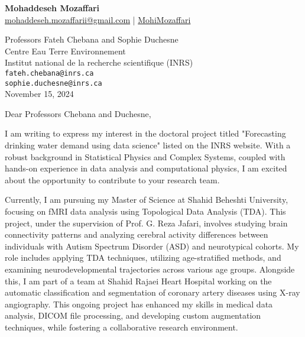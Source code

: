 \documentclass[letterpaper,11pt]{letter}
\begin{document}
\begin{center}
    \textbf{\Huge Mohaddeseh Mozaffari} \\
    \small{\href{mailto:mohaddeseh.mozaffarii@gmail.com}{ mohaddeseh.mozaffarii@gmail.com} | 	\href{https://www.linkedin.com/in/MohiMozaffari/}{ MohiMozaffari}}
\end{center}

\vspace{1em}

\begin{flushleft}
    Professors Fateh Chebana and Sophie Duchesne\\
    Centre Eau Terre Environnement\\
    Institut national de la recherche scientifique (INRS)\\
    \texttt{fateh.chebana@inrs.ca} \\
    \texttt{sophie.duchesne@inrs.ca} \\
    November 15, 2024
\end{flushleft}

\vspace{1em}

\begin{flushleft}
    Dear Professors Chebana and Duchesne,
\end{flushleft}

\vspace{1em}
I am writing to express my interest in the doctoral project titled "Forecasting drinking water demand using data science" listed on the INRS website. With a robust background in Statistical Physics and Complex Systems, coupled with hands-on experience in data analysis and computational physics, I am excited about the opportunity to contribute to your research team.

Currently, I am pursuing my Master of Science at Shahid Beheshti University, focusing on fMRI data analysis using Topological Data Analysis (TDA). This project, under the supervision of Prof. G. Reza Jafari, involves studying brain connectivity patterns and analyzing cerebral activity differences between individuals with Autism Spectrum Disorder (ASD) and neurotypical cohorts. My role includes applying TDA techniques, utilizing age-stratified methods, and examining neurodevelopmental trajectories across various age groups. Alongside this, I am part of a team at Shahid Rajaei Heart Hospital working on the automatic classification and segmentation of coronary artery diseases using X-ray angiography. This ongoing project has enhanced my skills in medical data analysis, DICOM file processing, and developing custom augmentation techniques, while fostering a collaborative research environment.
\end{document}
